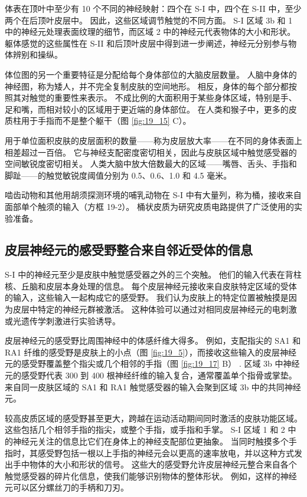 体表在顶叶中至少有 10 个不同的神经映射：四个在 S-I 中，四个在 S-II 中，至少两个在后顶叶皮层中。 
因此，这些区域调节触觉的不同方面。 
S-I 区域 3b 和 1 中的神经元处理表面纹理的细节，而区域 2 中的神经元代表物体的大小和形状。 
躯体感觉的这些属性在 S-II 和后顶叶皮层中得到进一步阐述，神经元分别参与物体辨别和操纵。


体位图的另一个重要特征是分配给每个身体部位的大脑皮层数量。 
人脑中身体的神经图，称为矮人，并不完全复制皮肤的空间地形。 
相反，身体的每个部分都按照其对触觉的重要性来表示。 
不成比例的大面积用于某些身体区域，特别是手、足和嘴，而相对较小的区域用于更近端的身体部位。 
在人类和猴子中，更多的皮质柱用于手指而不是整个躯干（图 \ref{fig:19_15} C）。


用于单位面积皮肤的皮层面积的数量——称为皮层放大率——在不同的身体表面上相差超过一百倍。 
它与神经支配密度密切相关，因此与皮肤区域中触觉感受器的空间敏锐度密切相关。 
人类大脑中放大倍数最大的区域——嘴唇、舌头、手指和脚趾——的触觉敏锐度阈值分别为 0.5、0.6、1.0 和 4.5 毫米。


啮齿动物和其他用胡须探测环境的哺乳动物在 S-I 中有大量列，称为桶，接收来自面部单个触须的输入（方框 19-2）。 
桶状皮质为研究皮质电路提供了广泛使用的实验准备。


\subsection{皮层神经元的感受野整合来自邻近受体的信息}
S-I 中的神经元至少是皮肤中触觉感受器之外的三个突触。 
他们的输入代表在背柱核、丘脑和皮层本身处理的信息。 
每个皮层神经元接收来自皮肤特定区域的受体的输入，这些输入一起构成它的感受野。 
我们认为皮肤上的特定位置被触摸是因为皮层中特定的神经元群被激活。 
这种体验可以通过对相同皮层神经元的电刺激或光遗传学刺激进行实验诱导。


皮层神经元的感受野比周围神经中的体感纤维大得多。 
例如，支配指尖的 SA1 和 RA1 纤维的感受野是皮肤上的小点（图 \ref{fig:19_5}），而接收这些输入的皮层神经元的感受野覆盖整个指尖或几个相邻的手指（图 \ref{fig:19_17} B） . 区域 3b 中神经元的感受野代表 300 到 400 根神经纤维的输入复合，通常覆盖单个指骨或掌垫。 来自同一皮肤区域的 SA1 和 RA1 触觉感受器的输入会聚到区域 3b 中的共同神经元。


较高皮质区域的感受野甚至更大，跨越在运动活动期间同时激活的皮肤功能区域。 
这些包括几个相邻手指的指尖，或整个手指，或手指和手掌。 
S-I 区域 1 和 2 中的神经元关注的信息比它们在身体上的神经支配部位更抽象。 
当同时触摸多个手指时，其感受野包括一根以上手指的神经元会以更高的速率放电，并以这种方式发出手中物体的大小和形状的信号。 
这些大的感受野允许皮层神经元整合来自各个触觉感受器的碎片化信息，使我们能够识别物体的整体形状。 
例如，这样的神经元可以区分螺丝刀的手柄和刀刃。


